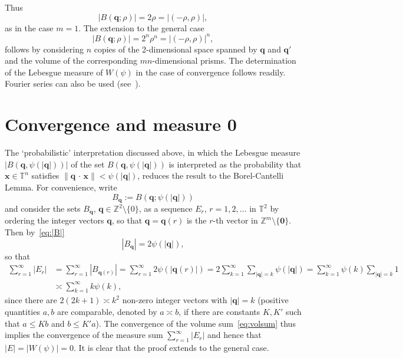 \documentclass[reqno]{amsart}
\renewcommand{\le}{\leqslant}
\newcommand{\T}{{\mathbb{T}}}
\newcommand{\Z}{{\mathbb{Z}}}
\newcommand{\0}{{\mathbf{0}}}
\newcommand{\q}{{\mathbf{q}}}
\newcommand{\xb}{\mathbf{x}}
\newcommand{\ip}{\,{\cdot}\,}
\def\Bqbr{B(\q;\rho)}
\def\B|qb|p{B(\q;\psi(|\q|))}
\begin{document}
Thus
\begin{equation}
  \label{eq:|B|}
|\Bqbr|
=2\rho = |(-\rho,\rho)|,
\end{equation}
as in the case $m=1$.  The extension to the general case 
\begin{equation*}
  \label{eq:|Bmn|}
|\Bqbr| 
=2^n\rho^n = |(-\rho,\rho)|^n,
\end{equation*}
follows by considering $n $ copies of the 2-dimensional space spanned
by $\q$ and $\q'$ and the volume of the corresponding $mn$-dimensional
prisms.  The determination of the Lebesgue measure of $W(\psi)$ in the
case of convergence follows readily.  Fourier series can also be used
(see~\cite{Sprindzuk}).

\section{Convergence and measure 0}
The `probabilistic' interpretation discussed above, in which the
Lebesgue measure $|B(\q,\psi(|\q|))|$ of the set $B(\q,\psi(|\q|))$ is
interpreted as the probability that $\xb \in \T^n$ satisfies $\|\q\ip
\xb \|<\psi(|\q|)$, reduces the result to the Borel-Cantelli Lemma.  
For convenience, write 
\begin{equation}
  \label{eq:Bq}
  B_\q:= \B|qb|p 
\end{equation}
and consider the sets $B_\q$, $\q\in\Z^2\setminus\{0\}$, as a
 sequence $E_r$, $r=1,2,\dots$ in $\T^2$ by ordering the integer vectors
 $\q$, so that $\q=\q(r)$ is the $r$-th vector in
 $\Z^m\setminus\{\0\}$. 
 Then by~\eqref{eq:|B|} 
 \begin{equation*}
 |B_\q| =  2\psi(|\q|) ,
 \end{equation*}
so that
\begin{align*}
  \sum_{r=1}^\infty |E_r| &= \sum_{r=1}^\infty |B_{\q(r)}|
  =
  \sum_{r=1}^\infty 2\psi(|\q(r)|) 
 = 2\sum_{k=1}^\infty\sum_{|\q|=k}\psi(|\q|)=
  \sum_{k=1}^\infty\psi(k)\sum_{|\q|=k}1 \\
  &\asymp \sum_{k=1}^\infty k\psi(k),
\end{align*}
since there are $2(2k+1)\asymp k^2$ non-zero integer vectors with
$|\q|=k$ (positive quantities $a,b$ are comparable, denoted by
$a\asymp b$, if there are constants $K,K'$ such that $a\le Kb$ and
$b\le K'a$).  The convergence of the volume sum~\eqref{eq:volsum} thus
implies the convergence of the measure sum $ \sum_{r=1}^\infty |E_r|$
and hence that $|E|=|W(\psi)|=0$.  It is clear that the proof extends
to the general case.
\end{document}
